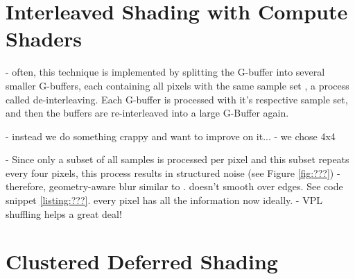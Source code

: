 
\section{Interleaved Shading with Compute Shaders}
\label{sec:impl:interleavedShading}
- often, this technique is implemented by splitting the G-buffer into several smaller G-buffers, each containing all pixels with the same sample set \cite{segovia2006non}, a process called de-interleaving. Each G-buffer is processed with it's respective sample set, and then the buffers are re-interleaved into a large G-Buffer again.

- instead we do something crappy and want to improve on it...
- we chose 4x4

- Since only a subset of all samples is processed per pixel and this subset repeats every four pixels, this process results in structured noise (see Figure \ref{fig:???})
- therefore, geometry-aware blur similar to \citet{laine2007incremental}. doesn't smooth over edges. See code snippet \ref{listing:???}. every pixel has all the information now ideally.
- VPL shuffling helps a great deal!

\section{Clustered Deferred Shading}
\label{sec:impl:clusteredShading}
